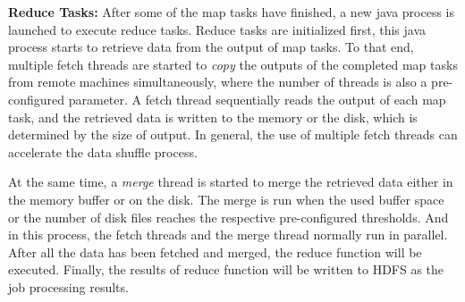 \noindent\textbf{Reduce Tasks:} After some of the map tasks have finished, a new java process is launched to execute reduce tasks. Reduce tasks are initialized first, this java process starts to retrieve data from the output of map tasks. To that end, multiple fetch threads are started to \textit{copy} the outputs of the completed map tasks from remote machines simultaneously, where the number of threads is also a pre-configured parameter. A fetch thread sequentially reads the output of each map task, and the retrieved data is written to the memory or the disk, which is determined by the size of output. In general, the use of multiple fetch threads can accelerate the data shuffle process.

At the same time, a \textit{merge} thread is started to merge the retrieved data either in the memory buffer or on the disk. The merge is run when the used buffer space or the number of disk files reaches the respective pre-configured thresholds. And in this process, the fetch threads and the merge thread normally run in parallel.
After all the data has been fetched and merged, the reduce function will be executed. Finally, the results of reduce function will be written to HDFS\cite{Shvachko2010The} as the job processing results.
